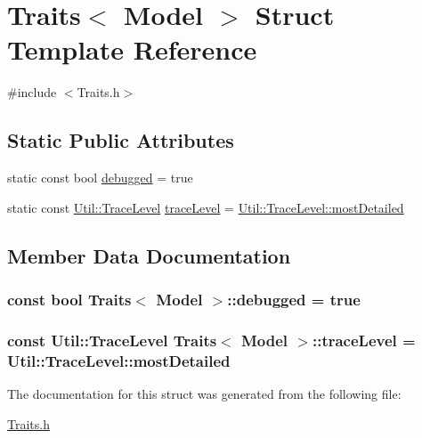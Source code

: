 \hypertarget{struct_traits_3_01_model_01_4}{}\section{Traits$<$ Model $>$ Struct Template Reference}
\label{struct_traits_3_01_model_01_4}


{\ttfamily \#include $<$Traits.\+h$>$}

\subsection*{Static Public Attributes}
\begin{DoxyCompactItemize}
\item 
static const bool \hyperlink{struct_traits_3_01_model_01_4_a027110f826901a79353bd286be774fe4}{debugged} = true
\item 
static const \hyperlink{class_util_a0a3482cfa2d915e261c0cf528fdc7afc}{Util\+::\+Trace\+Level} \hyperlink{struct_traits_3_01_model_01_4_a2514a0ce35ca8177c4605b4b2266eb05}{trace\+Level} = \hyperlink{class_util_a0a3482cfa2d915e261c0cf528fdc7afcaac18d2ea075dba67f95df9a907eee741}{Util\+::\+Trace\+Level\+::most\+Detailed}
\end{DoxyCompactItemize}


\subsection{Member Data Documentation}
\subsubsection[{\texorpdfstring{debugged}{debugged}}]{\setlength{\rightskip}{0pt plus 5cm}const bool {\bf Traits}$<$ {\bf Model} $>$\+::debugged = true\hspace{0.3cm}{\ttfamily [static]}}\hypertarget{struct_traits_3_01_model_01_4_a027110f826901a79353bd286be774fe4}{}\label{struct_traits_3_01_model_01_4_a027110f826901a79353bd286be774fe4}
\subsubsection[{\texorpdfstring{trace\+Level}{traceLevel}}]{\setlength{\rightskip}{0pt plus 5cm}const {\bf Util\+::\+Trace\+Level} {\bf Traits}$<$ {\bf Model} $>$\+::trace\+Level = {\bf Util\+::\+Trace\+Level\+::most\+Detailed}\hspace{0.3cm}{\ttfamily [static]}}\hypertarget{struct_traits_3_01_model_01_4_a2514a0ce35ca8177c4605b4b2266eb05}{}\label{struct_traits_3_01_model_01_4_a2514a0ce35ca8177c4605b4b2266eb05}


The documentation for this struct was generated from the following file\+:\begin{DoxyCompactItemize}
\item 
\hyperlink{_traits_8h}{Traits.\+h}\end{DoxyCompactItemize}
